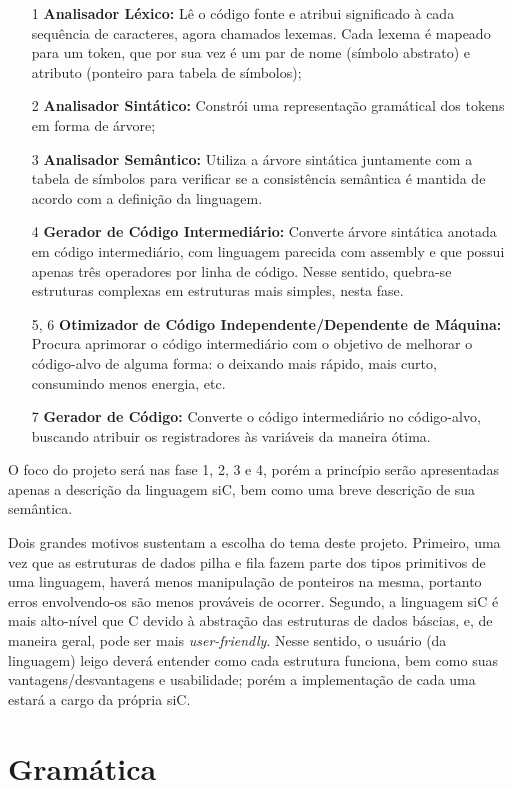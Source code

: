 \documentclass[12pt]{article}
\begin{document}
\begin{itemize}
	\item[1] \textbf{Analisador Léxico:} Lê o código fonte e atribui significado à cada sequência de caracteres, agora chamados lexemas. Cada lexema é mapeado para um token, que por sua vez é um par de nome (símbolo abstrato) e atributo (ponteiro para tabela de símbolos);
	\item[2] \textbf{Analisador Sintático:} Constrói uma representação gramátical dos tokens em forma de árvore;
	\item[3] \textbf{Analisador Semântico:} Utiliza a árvore sintática juntamente com a tabela de símbolos para verificar se a consistência semântica é mantida de acordo com a definição da linguagem.
	\item[4] \textbf{Gerador de Código Intermediário:} Converte árvore sintática anotada em código intermediário, com linguagem parecida com assembly e que possui apenas três operadores por linha de código. Nesse sentido, quebra-se estruturas complexas em estruturas mais simples, nesta fase.
	\item[5, 6] \textbf{Otimizador de Código Independente/Dependente de Máquina:} Procura aprimorar o código intermediário com o objetivo de melhorar o código-alvo de alguma forma: o deixando mais rápido, mais curto, consumindo menos energia, etc.
	\item[7] \textbf{Gerador de Código:} Converte o código intermediário no código-alvo, 	buscando atribuir os registradores às variáveis da maneira ótima.
\end{itemize}

\indent O foco do projeto será nas fase 1, 2, 3 e 4, porém a princípio serão apresentadas apenas a descrição da linguagem siC, bem como uma breve descrição de sua semântica.

\indent Dois grandes motivos sustentam a escolha do tema deste projeto. Primeiro, uma vez que as estruturas de dados pilha e fila fazem parte dos tipos primitivos de uma linguagem, haverá menos manipulação de ponteiros na mesma, portanto erros envolvendo-os são menos prováveis de ocorrer. Segundo, a linguagem siC é mais alto-nível que C devido à abstração das estruturas de dados báscias, e, de maneira geral, pode ser mais \textit{user-friendly}. Nesse sentido, o usuário (da linguagem) leigo deverá entender como cada estrutura funciona, bem como suas vantagens/desvantagens e usabilidade; porém a implementação de cada uma estará a cargo da própria siC.


\section{Gramática}
\end{document}
